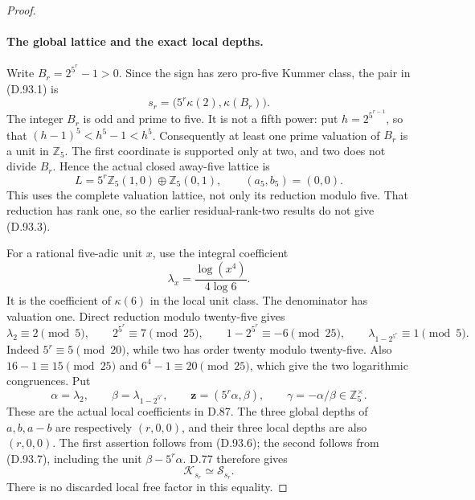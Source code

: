 \begin{proof}
\paragraph{The global lattice and the exact local depths.}
Write \(B_r=2^{5^r}-1>0\). Since the sign has zero pro-five
Kummer class, the pair in (D.93.1) is
\[
        s_r=\bigl(5^r\kappa(2),\kappa(B_r)\bigr).
                                                               \tag{D.93.5}
\]
The integer \(B_r\) is odd and prime to five. It is not a
fifth power: put \(h=2^{5^{r-1}}\), so that
\((h-1)^5<h^5-1<h^5\). Consequently at least one prime
valuation of \(B_r\) is a unit in \(\mathbb Z_5\).
The first coordinate is supported only at two, and two does
not divide \(B_r\). Hence the actual closed away-five lattice is
\[
        L=5^r\mathbb Z_5(1,0)\oplus\mathbb Z_5(0,1),
             \qquad (a_5,b_5)=(0,0).                  \tag{D.93.6}
\]
This uses the complete valuation lattice, not only its reduction
modulo five. That reduction has rank one, so the earlier
residual-rank-two results do not give (D.93.3).

For a rational five-adic unit \(x\), use the integral coefficient
\[
                   \lambda_x=\frac{\log(x^4)}{4\log6}.
\]
It is the coefficient of \(\kappa(6)\) in the local unit class.
The denominator has valuation one. Direct reduction modulo
twenty-five gives
\[
 \lambda_2\equiv2\pmod5,\qquad
 2^{5^r}\equiv7\pmod{25},\qquad
 1-2^{5^r}\equiv-6\pmod{25},
 \qquad
 \lambda_{1-2^{5^r}}\equiv1\pmod5.                    \tag{D.93.7}
\]
Indeed \(5^r\equiv5\pmod{20}\), while two has order twenty
modulo twenty-five. Also
\(16-1\equiv15\pmod{25}\) and \(6^4-1\equiv20\pmod{25}\),
which give the two logarithmic congruences.
Put
\[
 \alpha=\lambda_2,\qquad
 \beta=\lambda_{1-2^{5^r}},\qquad
 \mathbf z=(5^r\alpha,\beta),\qquad
 \gamma=-\alpha/\beta\in\mathbb Z_5^\times .
                                                               \tag{D.93.8}
\]
These are the actual local coefficients in D.87.
The three global depths of \(a,b,a-b\) are respectively
\((r,0,0)\), and their three local depths are also \((r,0,0)\).
The first assertion follows from (D.93.6); the second follows
from (D.93.7), including the unit \(\beta-5^r\alpha\).
D.77 therefore gives
\[
                       \mathcal K_{s_r}\simeq
                       \mathcal S_{s_r}.              \tag{D.93.9}
\]
There is no discarded local free factor in this equality.


\end{proof}
